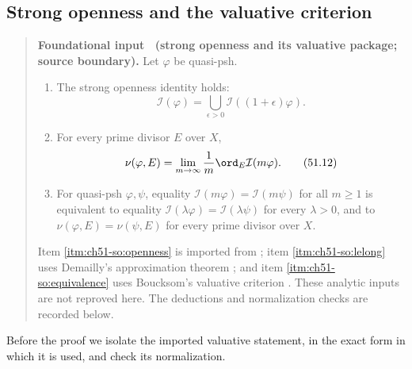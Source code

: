 \subsection{Strong openness and the valuative criterion}
\label{sec:ch51-openness}

\label{thm:complex-strong-openness}
\begin{quote}
\textbf{Foundational input \thetheorem\ (strong openness and its
valuative package; source boundary).}
Let \(\varphi\) be quasi-psh.
\begin{enumerate}
\item\label{itm:ch51-so:openness} The strong openness identity holds:
      \[
      \mathcal I(\varphi)
       =\bigcup_{\epsilon>0}\mathcal I((1+\epsilon)\varphi).
      \tag{51.11}\label{eq:complex-strong-openness}
      \]
\item\label{itm:ch51-so:lelong} For every prime divisor \(E\) over \(X\),
      \[
      \nu(\varphi,E)
       =\lim_{m\to\infty}\frac1m
                    \ord_E\mathcal I(m\varphi).
      \tag{51.12}\label{eq:complex-lelong-from-ideals}
      \]
\item\label{itm:ch51-so:equivalence} For quasi-psh \(\varphi,\psi\), equality
      \(\mathcal I(m\varphi)=\mathcal I(m\psi)\) for all
      \(m\geq1\) is equivalent to equality
      \(\mathcal I(\lambda\varphi)=\mathcal I(\lambda\psi)\) for
      every \(\lambda>0\), and to
      \(\nu(\varphi,E)=\nu(\psi,E)\) for every prime divisor over \(X\).
\end{enumerate}
\par
Item \cref{itm:ch51-so:openness} is imported from
\cite[Theorem~1.1]{GZ15}; item \cref{itm:ch51-so:lelong} uses Demailly's
approximation theorem \cite{Dem92reg}; and item
\cref{itm:ch51-so:equivalence} uses Boucksom's valuative criterion
\cite[Corollary~10.18]{Bou17}.  These analytic inputs are not reproved
here.  The deductions and normalization checks are recorded below.
\end{quote}

Before the proof we isolate the imported valuative statement, in the exact
form in which it is used, and check its normalization.

